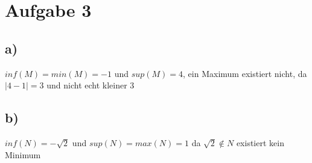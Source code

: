 \section{Aufgabe 3}
    \subsection{a)}
        $inf(M)=min(M)=-1$ und $sup(M)=4$, ein Maximum existiert nicht, da $|4-1|=3$ und nicht echt kleiner 3
    \subsection{b)}
        $inf(N)=-\sqrt{2}$ und $sup(N)=max(N)=1$ da $\sqrt{2} \notin N$ existiert kein Minimum